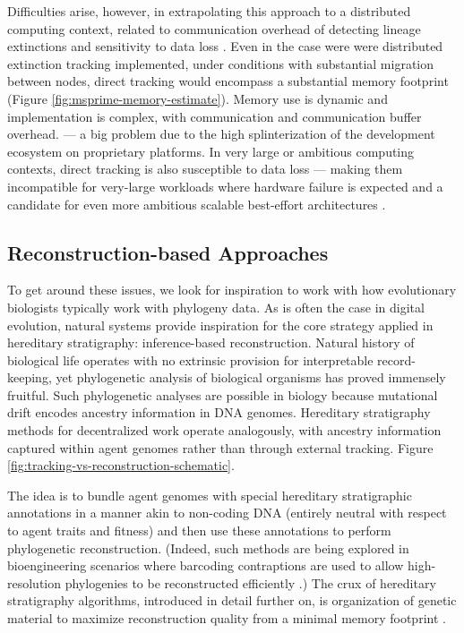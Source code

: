 Difficulties arise, however, in extrapolating this approach to a distributed computing context, related to communication overhead of detecting lineage extinctions and sensitivity to data loss \citep{moreno2024algorithms}.
Even in the case were were distributed extinction tracking implemented, under conditions with substantial migration between nodes, direct tracking would encompass a substantial  memory footprint (Figure \ref{fig:msprime-memory-estimate}).
Memory use is dynamic and implementation is complex, with communication and communication buffer overhead.
 --- a big problem due to the high splinterization of the development ecosystem on proprietary platforms.
In very large or ambitious computing contexts, direct tracking is also susceptible to data loss --- making them incompatible for very-large workloads where hardware failure is expected and a candidate for even more ambitious scalable best-effort architectures \citep{TODOackley}.

\subsection{Reconstruction-based Approaches}

To get around these issues, we look for inspiration to work with how evolutionary biologists typically work with phylogeny data.
As is often the case in digital evolution, natural systems provide inspiration for the core strategy applied in hereditary stratigraphy: inference-based reconstruction.
Natural history of biological life operates with no extrinsic provision for interpretable record-keeping, yet phylogenetic analysis of biological organisms has proved immensely fruitful.
Such phylogenetic analyses are possible in biology because mutational drift encodes ancestry information in DNA genomes.
Hereditary stratigraphy methods for decentralized work operate analogously, with ancestry information captured within agent genomes rather than through external tracking.
Figure \ref{fig:tracking-vs-reconstruction-schematic}.

The idea is to bundle agent genomes with special hereditary stratigraphic annotations in a manner akin to non-coding DNA (entirely neutral with respect to agent traits and fitness) and then use these annotations to perform phylogenetic reconstruction.
(Indeed, such methods are being explored in bioengineering scenarios where barcoding contraptions are used to allow high-resolution phylogenies to be reconstructed efficiently \citep{TODO}.)
The crux of hereditary stratigraphy algorithms, introduced in detail further on, is organization of genetic material to maximize reconstruction quality from a minimal memory footprint \citep{moreno2022hereditary}.

